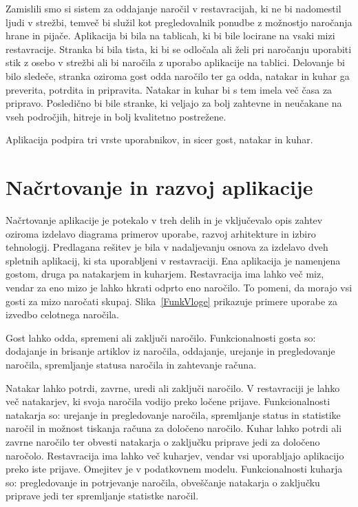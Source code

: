 \documentclass[a4paper, 12pt]{book}
\begin{document}
Zamislili smo si sistem za oddajanje naročil v restavracijah, ki ne bi nadomestil ljudi v strežbi, temveč bi služil kot pregledovalnik ponudbe z možnostjo naročanja hrane in pijače. Aplikacija bi bila na tablicah, ki bi bile locirane na vsaki mizi restavracije. Stranka bi bila tista, ki bi se odločala ali želi pri naročanju uporabiti stik z osebo v strežbi ali bi naročila z uporabo aplikacije na tablici. Delovanje bi bilo sledeče, stranka oziroma gost odda naročilo ter ga odda, natakar in kuhar ga preverita, potrdita in pripravita.  Natakar in kuhar bi s tem imela več časa za pripravo. Posledično bi bile stranke, ki veljajo za bolj zahtevne in neučakane na vseh področjih, hitreje in bolj kvalitetno postrežene. 

Aplikacija podpira tri vrste uporabnikov, in sicer gost, natakar in kuhar. 


\chapter{Načrtovanje in razvoj aplikacije}

Načrtovanje aplikacije je potekalo v treh delih in je vključevalo opis zahtev oziroma izdelavo diagrama primerov uporabe, razvoj arhitekture in izbiro tehnologij. 
Predlagana rešitev je bila v nadaljevanju osnova za izdelavo dveh spletnih aplikacij, ki sta uporabljeni v restavraciji. Ena aplikacija je namenjena gostom, druga pa natakarjem in kuharjem. Restavracija ima lahko več miz, vendar za eno mizo je lahko hkrati odprto eno naročilo. To pomeni, da morajo vsi gosti za mizo naročati skupaj. Slika~\ref{FunkVloge} prikazuje primere uporabe za izvedbo celotnega naročila. 

Gost lahko odda, spremeni ali zaključi naročilo. Funkcionalnosti gosta so: dodajanje in brisanje artiklov iz naročila, oddajanje, urejanje in pregledovanje naročila, spremljanje statusa naročila in zahtevanje računa. 

Natakar lahko potrdi, zavrne, uredi ali zaključi naročilo. V restavraciji je lahko več natakarjev, ki svoja naročila vodijo preko ločene prijave. Funkcionalnosti natakarja so: urejanje in pregledovanje naročila, spremljanje status in statistike naročil in možnost tiskanja računa za določeno naročilo. Kuhar lahko potrdi ali zavrne naročilo ter obvesti natakarja o zaključku priprave jedi za določeno naročolo. Restavracija ima lahko več kuharjev, vendar vsi uporabljajo aplikacijo preko iste prijave. Omejitev je v podatkovnem modelu. Funkcionalnosti kuharja so: pregledovanje in potrjevanje naročila, obveščanje natakarja o zaključku priprave jedi ter spremljanje statistke naročil. 
\end{document}
